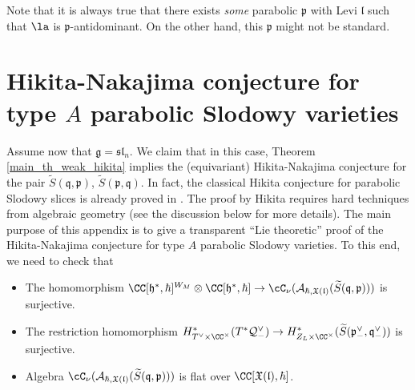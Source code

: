 \documentclass[12pt]{amsart}
\begin{document}
Note that it is always true that there exists {\emph{some}} parabolic $\mathfrak{p}$ with Levi $\mathfrak{l}$ such that $\la$ is 
$\mathfrak{p}$-antidominant. On the other hand, this $\mathfrak{p}$ might not be standard.





	









\section{Hikita-Nakajima conjecture for type $A$ parabolic Slodowy varieties}\label{app_HN_type_A}
Assume now that $\mathfrak{g}=\mathfrak{sl}_n$. We claim that in this case, Theorem \ref{main_th_weak_hikita} implies the (equivariant) Hikita-Nakajima conjecture for the pair $\widetilde{S}(\mathfrak{q},\mathfrak{p})$, $\widetilde{S}(\mathfrak{p},\mathfrak{q})$. In fact, the classical Hikita conjecture for parabolic Slodowy slices is already proved in \cite[Appendix A]{Hikita}. The proof by Hikita requires hard techniques from algebraic geometry (see the discussion below for more details). The main purpose of this appendix is to give a transparent ``Lie theoretic'' proof of the Hikita-Nakajima conjecture for type $A$ parabolic Slodowy varieties. To this end, we need to check that 
\begin{itemize}
    \item[(a)]  The homomorphism $\CC[\mathfrak{h}^*,\hbar]^{W_M} \otimes \CC[\mathfrak{h}^*,\hbar] \rightarrow \cC_\nu(\mathcal{A}_{\hbar,\mathfrak{X}(\mathfrak{l})}(\widetilde{S}(\mathfrak{q},\mathfrak{p})))$ is surjective. 
    \item[(b)] The restriction homomorphism $H^*_{T^\vee \times \CC^\times}(T^*\mathcal{Q}^\vee_-) \rightarrow H^*_{Z_L \times \CC^\times}(\widetilde{S}(\mathfrak{p}^\vee_-,\mathfrak{q}^\vee_-))$ is surjective. 
    \item[(c)] Algebra $\cC_\nu(\mathcal{A}_{\hbar,\mathfrak{X}(\mathfrak{l})}(\widetilde{S}(\mathfrak{q},\mathfrak{p})))$ is flat over $\CC[\mathfrak{X}(\mathfrak{l}),\hbar]$.
\end{itemize}
\end{document}
